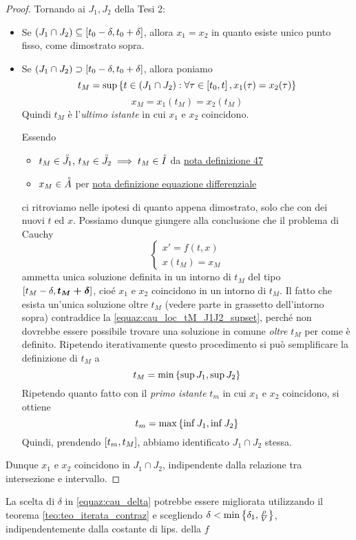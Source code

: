 \begin{proof}
	Tornando ai $J_1, J_2$ della Tesi 2:
	\begin{itemize}
		\item Se $(J_1 \cap J_2) \subseteq \left[t_0-\delta,t_0+\delta\right]$, allora $x_1 = x_2$ in quanto esiste unico punto fisso, come dimostrato sopra.
		\item Se $(J_1 \cap J_2) \supset \left[t_0-\delta,t_0+\delta\right]$, allora poniamo
			\begin{equation}
				t_M = \sup \left\{t \in (J_1 \cap J_2): \forall \tau \in \left[t_0,t\right], x_1(\tau)=x_2(\tau)\right\}\label{equaz:cau_loc_tM_J1J2_supset}
			\end{equation}
			$$x_M = x_1(t_M) = x_2(t_M)$$
			Quindi $t_M$ è l'\textit{ultimo istante} in cui $x_1$ e $x_2$ coincidono.

			Essendo
			\begin{itemize}
				\item $t_M \in \accentset{\circ}{J_1},\,t_M \in \accentset{\circ}{J_2} \implies t_M \in \accentset{\circ}{I}$ da \hyperlink{note:diff_eq_sol_definit_set}{nota definizione 47}
				\item $x_M \in \accentset{\circ}{A}$ per \hyperlink{def:equaz_diff_sol}{nota definizione equazione differenziale}
			\end{itemize}
			ci ritroviamo nelle ipotesi di quanto appena dimostrato, solo che con dei nuovi $t$ ed $x$. Possiamo dunque giungere alla conclusione che il problema di Cauchy
			$$\begin{cases}x'=f(t,x)\\x(t_M)=x_M\end{cases}$$
			ammetta unica soluzione definita in un intorno di $t_M$ del tipo $\left[t_M-\delta,\boldsymbol{t_M+\delta}\right]$, cioé $x_1$ e $x_2$ coincidono in un intorno di $t_M$. Il fatto che esista un'unica soluzione oltre $t_M$ (vedere parte in grassetto dell'intorno sopra) contraddice la \ref{equaz:cau_loc_tM_J1J2_supset}, perché non dovrebbe essere possibile trovare una soluzione in comune \textit{oltre} $t_M$ per come è definito. Ripetendo iterativamente questo procedimento si può semplificare la definizione di $t_M$ a
			$$t_M = \min \left\{\sup J_1, \sup J_2\right\}$$
			Ripetendo quanto fatto con il \textit{primo istante} $t_m$ in cui $x_1$ e $x_2$ coincidono, si ottiene
			$$t_m = \max \left\{\inf J_1, \inf J_2\right\}$$
			Quindi, prendendo $\left[t_m,t_M\right]$, abbiamo identificato $J_1 \cap J_2$ stessa.
	\end{itemize}
	Dunque $x_1$ e $x_2$ coincidono in $J_1 \cap J_2$, indipendente dalla relazione tra intersezione e intervallo.
\end{proof}
\begin{note}
	La scelta di $\delta$ in \ref{equaz:cau_delta} potrebbe essere migliorata utilizzando il teorema \ref{teo:teo_iterata_contraz} e scegliendo $\delta<\min\left\{\delta_1,\frac{\rho}{V}\right\}$, indipendentemente dalla costante di lips. della $f$
\end{note}

